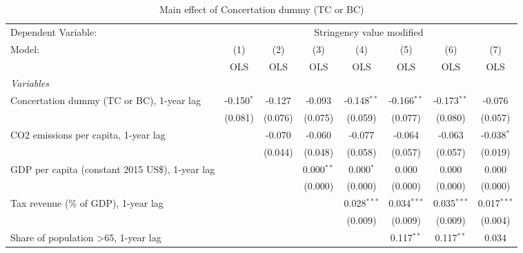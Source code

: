 
\begin{table}[htbp]
   \caption{Main effect of Concertation dummy (TC or BC)}
   \centering
   \begin{tabular}{lccccccc}
      \toprule
      Dependent Variable: & \multicolumn{7}{c}{Stringency value modified}\\
      Model:                                                & (1)          & (2)     & (3)          & (4)           & (5)           & (6)           & (7)\\  
                                                            &  OLS         & OLS     & OLS          & OLS           & OLS           & OLS           & OLS\\  
      \midrule
      \emph{Variables}\\
      Concertation dummy (TC or BC), 1-year lag             & -0.150$^{*}$ & -0.127  & -0.093       & -0.148$^{**}$ & -0.166$^{**}$ & -0.173$^{**}$ & -0.076\\   
                                                            & (0.081)      & (0.076) & (0.075)      & (0.059)       & (0.077)       & (0.080)       & (0.057)\\   
      CO2 emissions per capita, 1-year lag                  &              & -0.070  & -0.060       & -0.077        & -0.064        & -0.063        & -0.038$^{*}$\\   
                                                            &              & (0.044) & (0.048)      & (0.058)       & (0.057)       & (0.057)       & (0.019)\\   
      GDP per capita (constant 2015 US\$), 1-year lag       &              &         & 0.000$^{**}$ & 0.000$^{*}$   & 0.000         & 0.000         & 0.000\\   
                                                            &              &         & (0.000)      & (0.000)       & (0.000)       & (0.000)       & (0.000)\\   
      Tax revenue (\% of GDP), 1-year lag                   &              &         &              & 0.028$^{***}$ & 0.034$^{***}$ & 0.035$^{***}$ & 0.017$^{***}$\\   
                                                            &              &         &              & (0.009)       & (0.009)       & (0.009)       & (0.004)\\   
      Share of population >65, 1-year lag                   &              &         &              &               & 0.117$^{**}$  & 0.117$^{**}$  & 0.034\\   

\end{tabular}
\end{table}
